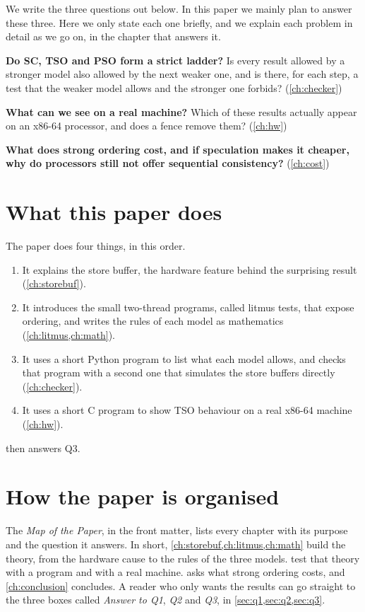We write the three questions out below. In this paper we mainly plan to answer these three. Here we only state each one briefly, and we explain each problem in detail as we go on, in the chapter that answers it.

\begin{description}[leftmargin=1.2cm,style=nextline]
\item[Q1] \textbf{Do SC, TSO and PSO form a strict ladder?} Is every result allowed by a stronger model also allowed by the next weaker one, and is there, for each step, a test that the weaker model allows and the stronger one forbids? (\cref{ch:checker})
\item[Q2] \textbf{What can we see on a real machine?} Which of these results actually appear on an x86-64 processor, and does a fence remove them? (\cref{ch:hw})
\item[Q3] \textbf{What does strong ordering cost, and if speculation makes it cheaper, why do processors still not offer sequential consistency?} (\cref{ch:cost})
\end{description}

\section{What this paper does}

The paper does four things, in this order.
\begin{enumerate}
\item It explains the store buffer, the hardware feature behind the surprising result (\cref{ch:storebuf}).
\item It introduces the small two-thread programs, called litmus tests, that expose ordering, and writes the rules of each model as mathematics (\cref{ch:litmus,ch:math}).
\item It uses a short Python program to list what each model allows, and checks that program with a second one that simulates the store buffers directly (\cref{ch:checker}).
\item It uses a short C program to show TSO behaviour on a real x86-64 machine (\cref{ch:hw}).
\end{enumerate}
 then answers Q3.

\section{How the paper is organised}

The \emph{Map of the Paper}, in the front matter, lists every chapter with its purpose and the question it answers. In short, \cref{ch:storebuf,ch:litmus,ch:math} build the theory, from the hardware cause to the rules of the three models.  test that theory with a program and with a real machine.  asks what strong ordering costs, and \cref{ch:conclusion} concludes. A reader who only wants the results can go straight to the three boxes called \emph{Answer to Q1}, \emph{Q2} and \emph{Q3}, in \cref{sec:q1,sec:q2,sec:q3}.

